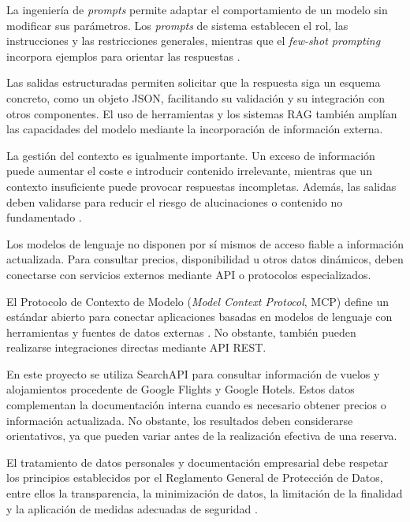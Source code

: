 La ingeniería de \textit{prompts} permite adaptar el comportamiento de un modelo sin modificar sus parámetros. Los \textit{prompts} de sistema establecen el rol, las instrucciones y las restricciones generales, mientras que el \textit{few-shot prompting} incorpora ejemplos para orientar las respuestas \parencite{brown2020fewshot}.

Las salidas estructuradas permiten solicitar que la respuesta siga un esquema concreto, como un objeto JSON, facilitando su validación y su integración con otros componentes. El uso de herramientas y los sistemas RAG también amplían las capacidades del modelo mediante la incorporación de información externa.

La gestión del contexto es igualmente importante. Un exceso de información puede aumentar el coste e introducir contenido irrelevante, mientras que un contexto insuficiente puede provocar respuestas incompletas. Además, las salidas deben validarse para reducir el riesgo de alucinaciones o contenido no fundamentado \parencite{ji2023hallucination}.

Los modelos de lenguaje no disponen por sí mismos de acceso fiable a información actualizada. Para consultar precios, disponibilidad u otros datos dinámicos, deben conectarse con servicios externos mediante API o protocolos especializados.

El Protocolo de Contexto de Modelo (\textit{Model Context Protocol}, MCP) define un estándar abierto para conectar aplicaciones basadas en modelos de lenguaje con herramientas y fuentes de datos externas \parencite{anthropic2024mcpannounce,mcp2025specification}. No obstante, también pueden realizarse integraciones directas mediante API REST.

En este proyecto se utiliza SearchAPI para consultar información de vuelos y alojamientos procedente de Google Flights y Google Hotels. Estos datos complementan la documentación interna cuando es necesario obtener precios o información actualizada. No obstante, los resultados deben considerarse orientativos, ya que pueden variar antes de la realización efectiva de una reserva.

El tratamiento de datos personales y documentación empresarial debe respetar los principios establecidos por el Reglamento General de Protección de Datos, entre ellos la transparencia, la minimización de datos, la limitación de la finalidad y la aplicación de medidas adecuadas de seguridad \parencite{gdpr2016}.

